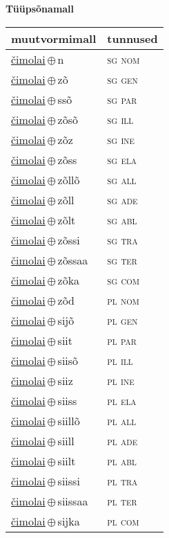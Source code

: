 

\vspace{3.5em}
\noindent \begin{minipage}{\textwidth}
\noindent \textbf{Tüüpsõnamall \,}\\

\begin{sideways}
\begin{tabular}{l l}
muutvormimall & tunnused \\
\hline
\underline{čimolai}\,$\oplus$\,n & \textsc{ sg nom } \\
\underline{čimolai}\,$\oplus$\,zõ & \textsc{ sg gen } \\
\underline{čimolai}\,$\oplus$\,ssõ & \textsc{ sg par } \\
\underline{čimolai}\,$\oplus$\,zõsõ & \textsc{ sg ill } \\
\underline{čimolai}\,$\oplus$\,zõz & \textsc{ sg ine } \\
\underline{čimolai}\,$\oplus$\,zõss & \textsc{ sg ela } \\
\underline{čimolai}\,$\oplus$\,zõllõ & \textsc{ sg all } \\
\underline{čimolai}\,$\oplus$\,zõll & \textsc{ sg ade } \\
\underline{čimolai}\,$\oplus$\,zõlt & \textsc{ sg abl } \\
\underline{čimolai}\,$\oplus$\,zõssi & \textsc{ sg tra } \\
\underline{čimolai}\,$\oplus$\,zõssaa & \textsc{ sg ter } \\
\underline{čimolai}\,$\oplus$\,zõka & \textsc{ sg com } \\
\underline{čimolai}\,$\oplus$\,zõd & \textsc{ pl nom } \\
\underline{čimolai}\,$\oplus$\,sijõ & \textsc{ pl gen } \\
\underline{čimolai}\,$\oplus$\,siit & \textsc{ pl par } \\
\underline{čimolai}\,$\oplus$\,siisõ & \textsc{ pl ill } \\
\underline{čimolai}\,$\oplus$\,siiz & \textsc{ pl ine } \\
\underline{čimolai}\,$\oplus$\,siiss & \textsc{ pl ela } \\
\underline{čimolai}\,$\oplus$\,siillõ & \textsc{ pl all } \\
\underline{čimolai}\,$\oplus$\,siill & \textsc{ pl ade } \\
\underline{čimolai}\,$\oplus$\,siilt & \textsc{ pl abl } \\
\underline{čimolai}\,$\oplus$\,siissi & \textsc{ pl tra } \\
\underline{čimolai}\,$\oplus$\,siissaa & \textsc{ pl ter } \\
\underline{čimolai}\,$\oplus$\,sijka & \textsc{ pl com } \\
\end{tabular}
\end{sideways}
\label{tab:tüüpsõnamall-čimolain}

\end{minipage}


